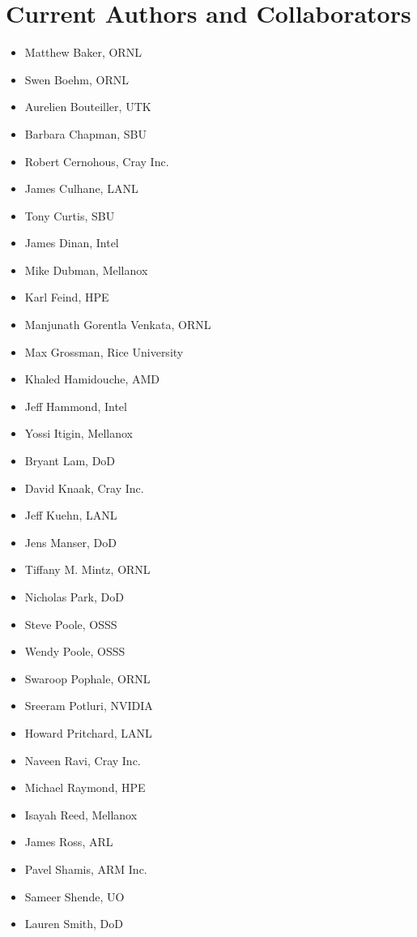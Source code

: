 \section*{Current Authors and Collaborators}
\begin{itemize}
\item Matthew Baker, \ac{ORNL}
\item Swen Boehm, \ac{ORNL}
\item Aurelien Bouteiller, \ac{UTK}
\item Barbara Chapman, \ac{SBU}
\item Robert Cernohous, Cray Inc.
\item James Culhane, \ac{LANL}
\item Tony Curtis, \ac{SBU}
\item James Dinan, Intel
\item Mike Dubman, Mellanox
\item Karl Feind, \ac{HPE}
\item Manjunath Gorentla Venkata, \ac{ORNL}
\item Max Grossman, Rice University
\item Khaled Hamidouche, \ac{AMD}
\item Jeff Hammond, Intel
\item Yossi Itigin, Mellanox
\item Bryant Lam, \ac{DoD}
\item David Knaak, Cray Inc.
\item Jeff Kuehn, \ac{LANL}
\item Jens Manser, \ac{DoD}
\item Tiffany M. Mintz, \ac{ORNL}
\item Nicholas Park, \ac{DoD}
\item Steve Poole, \ac{OSSS}
\item Wendy Poole, \ac{OSSS}
\item Swaroop Pophale, \ac{ORNL}
\item Sreeram Potluri, NVIDIA
\item Howard Pritchard, \ac{LANL}
\item Naveen Ravi, Cray Inc.
\item Michael Raymond, \ac{HPE}
\item Isayah Reed, Mellanox
\item James Ross, \ac{ARL}
\item Pavel Shamis, ARM Inc.
\item Sameer Shende, \ac{UO}
\item Lauren Smith, \ac{DoD}

\end{itemize}

